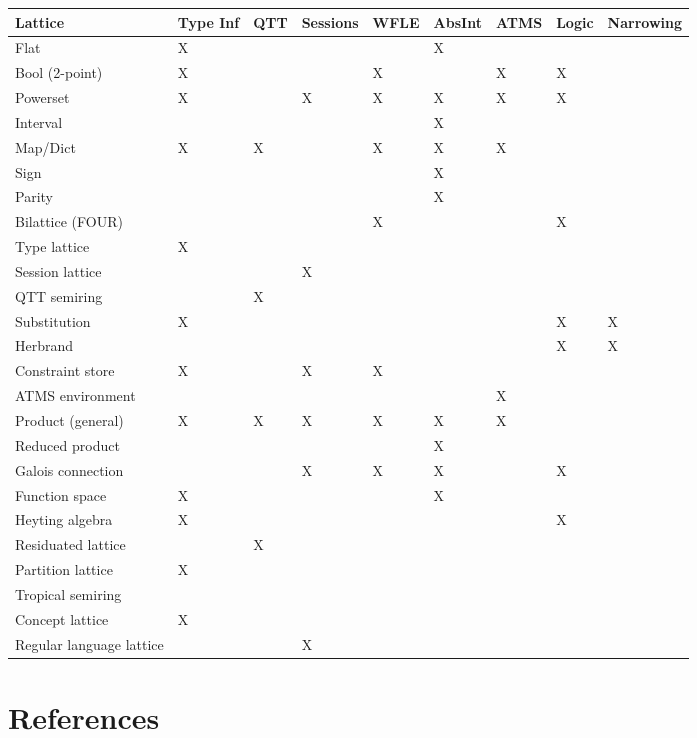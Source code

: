 \documentclass[11pt]{article}
\begin{document}
\begin{center}
\begin{tabular}{lllllllll}
Lattice & Type Inf & QTT & Sessions & WFLE & AbsInt & ATMS & Logic & Narrowing\\
\hline
Flat & X &  &  &  & X &  &  & \\
Bool (2-point) & X &  &  & X &  & X & X & \\
Powerset & X &  & X & X & X & X & X & \\
Interval &  &  &  &  & X &  &  & \\
Map/Dict & X & X &  & X & X & X &  & \\
Sign &  &  &  &  & X &  &  & \\
Parity &  &  &  &  & X &  &  & \\
Bilattice (FOUR) &  &  &  & X &  &  & X & \\
Type lattice & X &  &  &  &  &  &  & \\
Session lattice &  &  & X &  &  &  &  & \\
QTT semiring &  & X &  &  &  &  &  & \\
Substitution & X &  &  &  &  &  & X & X\\
Herbrand &  &  &  &  &  &  & X & X\\
Constraint store & X &  & X & X &  &  &  & \\
ATMS environment &  &  &  &  &  & X &  & \\
Product (general) & X & X & X & X & X & X &  & \\
Reduced product &  &  &  &  & X &  &  & \\
Galois connection &  &  & X & X & X &  & X & \\
Function space & X &  &  &  & X &  &  & \\
Heyting algebra & X &  &  &  &  &  & X & \\
Residuated lattice &  & X &  &  &  &  &  & \\
Partition lattice & X &  &  &  &  &  &  & \\
Tropical semiring &  &  &  &  &  &  &  & \\
Concept lattice & X &  &  &  &  &  &  & \\
Regular language lattice &  &  & X &  &  &  &  & \\
\end{tabular}
\end{center}
\section{References}
\label{sec:org29cb085}
\end{document}
